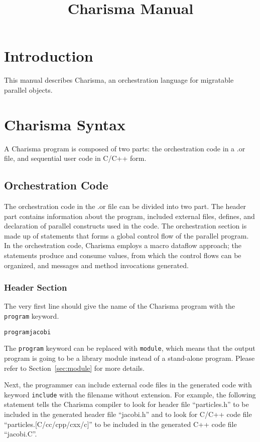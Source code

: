 \documentclass[10pt]{article}
\title{Charisma Manual}
\begin{document}
\maketitle

\section{Introduction}

This manual describes Charisma, an orchestration language for migratable
parallel objects. 

\section{Charisma Syntax}
A Charisma program is composed of two parts: the orchestration code in a .or
file, and sequential user code in C/C++ form. 

\subsection{Orchestration Code}
The orchestration code in the .or file can be divided into two part. The header
part contains information about the program, included external files, defines,
and declaration of parallel constructs used in the code. The orchestration
section is made up of statements that forms a global control flow of the
parallel program. In the orchestration code, Charisma employs a macro dataflow
approach; the statements produce and consume values, from which the control flows
can be organized, and messages and method invocations generated. 

\subsubsection{Header Section}

The very first line should give the name of the Charisma program with the {\tt
program} keyword.

\begin{alltt}
    program jacobi 
\end{alltt}

The {\tt program} keyword can be replaced with {\tt module}, which means that
the output program is going to be a library module instead of a stand-alone
program. Please refer to Section~\ref{sec:module} for more details.

Next, the programmer can include external code files in the generated code with
keyword {\tt include} with the filename without extension. For example, the
following statement tells the Charisma compiler to look for header file
``particles.h'' to be included in the generated header file ``jacobi.h'' and to
look for C/C++ code file ``particles.[C/cc/cpp/cxx/c]'' to be included in the
generated C++ code file ``jacobi.C''.
\end{document}
